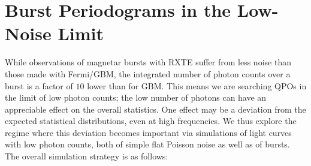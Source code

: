 \documentclass[numberedappendix]{emulateapj}
\begin{document}
\section{Burst Periodograms in the Low-Noise Limit}
\label{sec:weakbursts}

While observations of magnetar bursts with RXTE suffer from less noise than those made with Fermi/GBM, the integrated number of photon counts over a burst is a factor of $10$ lower than for GBM. This means we are searching QPOs in the limit of low photon counts; the low number of photons can have an appreciable effect on the overall statistics. One effect may be a deviation from the expected statistical distributions, even at high frequencies. We thus explore the regime where this deviation becomes important via simulations of light curves with low photon counts, both of simple flat Poisson noise as well as of bursts.
The overall simulation strategy is as follows:
\end{document}
